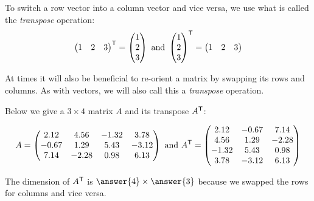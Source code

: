 \documentclass{ximera}
\begin{document}
\begin{exploration}
        \begin{definition}\label{def:transpose}
          To switch a row vector into a column vector and vice versa, we use what is called the \emph{transpose} operation:
          \[
          \begin{pmatrix} 1 &  2 & 3 \end{pmatrix}^{\mathsf{T}} =
          \begin{pmatrix} 1 \\ 2 \\ 3 \end{pmatrix}
          \text{ }\text{and}\text{ }
          \begin{pmatrix} 1 \\ 2 \\ 3 \end{pmatrix}^{\mathsf{T}} =
          \begin{pmatrix} 1 &  2 & 3 \end{pmatrix}
          \]
        \end{definition}

        At times it will also be beneficial to re-orient a matrix by swapping its rows and columns. As with vectors, we will also call this a \emph{transpose} operation. 
        
        \begin{example}

            Below we give a $3\times 4$ matrix $A$ and its transpose $A^{\mathsf{T}}$:

            \[
A=\begin{pmatrix}
    2.12 & 4.56 & -1.32 & 3.78 \\
    -0.67 & 1.29 & 5.43 & -3.12 \\
    7.14 & -2.28 & 0.98 & 6.13
\end{pmatrix}
\text{ } \text{and} \text{ }
A^{\mathsf{T}}=\begin{pmatrix}
    2.12 & -0.67 & 7.14 \\
    4.56 & 1.29 & -2.28 \\
    -1.32 & 5.43 & 0.98 \\
    3.78 & -3.12 & 6.13
\end{pmatrix}
\]

The dimension of $A^{\mathsf{T}}$ is $\answer{4}\times \answer{3}$ because we swapped the rows for columns and vice versa.

        \end{example}


\end{exploration}
\end{document}
